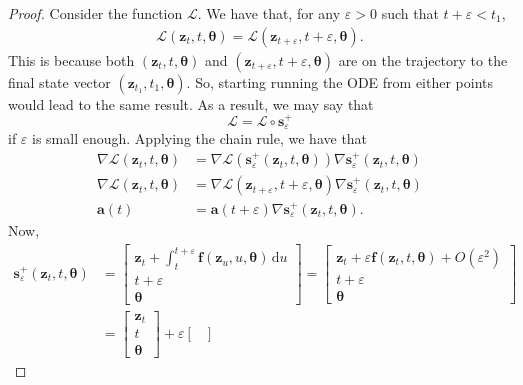 \documentclass[10pt]{article}
\newcommand{\dee}{\mathrm{d}}
\newcommand{\ve}[1]{\mathbf{#1}}
\newcommand{\ves}[1]{\boldsymbol{#1}}
\newcommand{\mcal}[1]{\mathcal{#1}}
\begin{document}
\begin{itemize}
\begin{proof}
    Consider the function $\mcal{L}$. We have that, for any $\varepsilon > 0$ such that $t + \varepsilon < t_1$, 
    \begin{align*}
      \mcal{L}(\ve{z}_t, t, \ves{\theta}) = \mcal{L}(\ve{z}_{t+\varepsilon}, t+\varepsilon, \ves{\theta}).
    \end{align*}
    This is because both $(\ve{z}_t, t, \ves{\theta})$ and $(\ve{z}_{t+\varepsilon}, t+\varepsilon, \ves{\theta})$ are on the trajectory to the final state vector $(\ve{z}_{t_1}, t_1, \ves{\theta})$. So, starting running the ODE from either points would lead to the same result. As a result, we may say that
    $$\mcal{L} = \mcal{L} \circ \ve{s}^+_\varepsilon$$
    if $\varepsilon$ is small enough. Applying the chain rule, we have that
    \begin{align*}
      \nabla \mcal{L}(\ve{z}_t, t, \ves{\theta})
      &= \nabla \mcal{L}(\ve{s}^+_\varepsilon(\ve{z}_t, t, \ves{\theta})) \nabla \ve{s}_{\varepsilon}^+(\ve{z}_t, t, \ves{\theta}) \\
      \nabla \mcal{L}(\ve{z}_t, t, \ves{\theta})
      &= \nabla \mcal{L}(\ve{z}_{t+\varepsilon}, t+\varepsilon, \ves{\theta}) \nabla \ve{s}_{\varepsilon}^+(\ve{z}_t, t, \ves{\theta}) \\
      \ve{a}(t) &= \ve{a}(t+\varepsilon) \nabla \ve{s}_{\varepsilon}^+(\ve{z}_t, t, \ves{\theta}).
    \end{align*}
    Now,
    \begin{align*}
      \ve{s}^+_\varepsilon(\ve{z}_t, t, \ves{\theta})
      &= \begin{bmatrix}
        \ve{z}_t + \int_{t}^{t+\varepsilon} \ve{f}(\ve{z}_u, u, \ves{\theta}) \, \dee u \\
        t + \varepsilon \\
        \ves{\theta}
      \end{bmatrix} 
      = \begin{bmatrix}
        \ve{z}_t + \varepsilon \ve{f}(\ve{z}_t, t, \ves{\theta}) + O(\varepsilon^2) \\
        t + \varepsilon \\
        \ves{\theta}
      \end{bmatrix} \\
      &= \begin{bmatrix}
        \ve{z}_t \\ t \\ \ves{\theta}
      \end{bmatrix} 
      + \varepsilon
      \begin{bmatrix}

\end{bmatrix}
\end{align*}
\end{proof}
\end{itemize}
\end{document}
